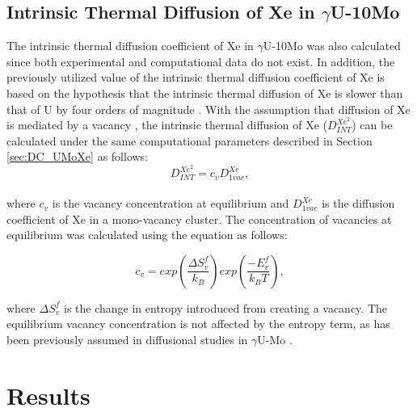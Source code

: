 \documentclass[preprint,12pt]{elsarticle}
\begin{document}
\subsection{Intrinsic Thermal Diffusion of Xe in $\gamma$U-10Mo}
The intrinsic thermal diffusion coefficient of Xe in $\gamma$U-10Mo was also calculated since both experimental and computational data do not exist. In addition, the previously utilized value of the intrinsic thermal diffusion coefficient of Xe is based on the hypothesis that the intrinsic thermal diffusion of Xe is slower than that of U by four orders of magnitude \cite{hu2016formation}. 
With the assumption that diffusion of Xe is mediated by a vacancy \cite{perriot2019atomistic, andersson2019density, andersson2011u, thompson2013pathway, bes2015experimental}, the intrinsic thermal diffusion of Xe ($D^{Xe^{2}}_{INT}$) can be calculated under the same computational parameters described in Section \ref{sec:DC_UMoXe} as follows:
\\
\begin{equation}
D^{Xe^{2}}_{INT} = c_{v}D_{1vac}^{Xe},
\end{equation}
\\
where $c_{v}$ is the vacancy concentration at equilibrium and $D_{1vac}^{Xe}$ is the diffusion coefficient of Xe in a mono-vacancy cluster. The concentration of vacancies at equilibrium was calculated using the equation as follows:

\begin{equation}
\label{eq:surface}
c_{v}=exp\left({\frac{\Delta S_{v}^{f}}{k_{B}}}\right) exp\left({\frac{-E_{v}^{f}}{k_{B}T}}\right),
\end{equation}

\noindent where $\Delta S^{f}_{v}$ is the change in entropy introduced from creating a vacancy. The equilibrium vacancy concentration is not affected by the entropy term, as has been previously assumed in diffusional studies in $\gamma$U-Mo \cite{park2021atomistic, smirnova2015investigation}.

\section{Results}
\end{document}
